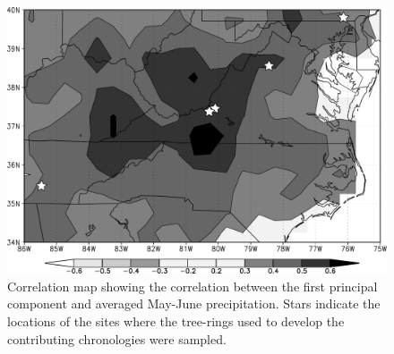 

\begin{figure}
\centering
\includegraphics[width=5in]{figures/corrMapPrecipMJ_bw_annot.pdf}
\caption{Correlation map showing the correlation between the first principal component and averaged May-June precipitation. Stars indicate the locations of the sites where the tree-rings used to develop the contributing chronologies were sampled.}
\label{fig:precipCorrMap}
\end{figure}

%

